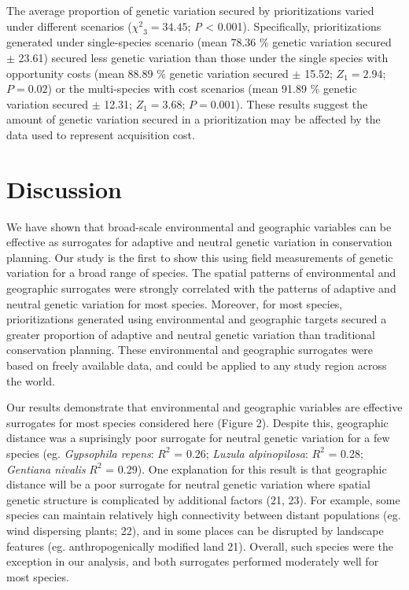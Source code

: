 \documentclass[9pt,twocolumn,twoside,lineno]{pnas-new}
\begin{document}
The average proportion of genetic variation secured by prioritizations
varied under different scenarios (\({\chi^2}_{3} = 34.45\); \emph{P}
\textless{} 0.001). Specifically, prioritizations generated under
single-species scenario (mean 78.36 \% genetic variation secured \(\pm\)
23.61) secured less genetic variation than those under the single
species with opportunity costs (mean 88.89 \% genetic variation secured
\(\pm\) 15.52; \(Z_1 = 2.94\); \(P = 0.02\)) or the multi-species with
cost scenarios (mean 91.89 \% genetic variation secured \(\pm\) 12.31;
\(Z_1 = 3.68\); \(P = 0.001\)). These results suggest the amount of
genetic variation secured in a prioritization may be affected by the
data used to represent acquisition cost.

\section*{Discussion}\label{discussion}

We have shown that broad-scale environmental and geographic variables
can be effective as surrogates for adaptive and neutral genetic
variation in conservation planning. Our study is the first to show this
using field measurements of genetic variation for a broad range of
species. The spatial patterns of environmental and geographic surrogates
were strongly correlated with the patterns of adaptive and neutral
genetic variation for most species. Moreover, for most species,
prioritizations generated using environmental and geographic targets
secured a greater proportion of adaptive and neutral genetic variation
than traditional conservation planning. These environmental and
geographic surrogates were based on freely available data, and could be
applied to any study region across the world.

Our results demonstrate that environmental and geographic variables are
effective surrogates for most species considered here (Figure 2).
Despite this, geographic distance was a suprisingly poor surrogate for
neutral genetic variation for a few species (eg. \emph{Gypsophila
repens}: \(R^2\) = 0.26; \emph{Luzula alpinopilosa}: \(R^2\) = 0.28;
\emph{Gentiana nivalis} \(R^2\) = 0.29). One explanation for this result
is that geographic distance will be a poor surrogate for neutral genetic
variation where spatial genetic structure is complicated by additional
factors (21, 23). For example, some species can maintain relatively high
connectivity between distant populations (eg. wind dispersing plants;
22), and in some places can be disrupted by landscape features (eg.
anthropogenically modified land 21). Overall, such species were the
exception in our analysis, and both surrogates performed moderately well
for most species.
\end{document}
